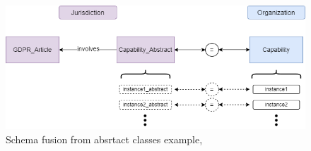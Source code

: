 \documentclass[
  a4paper,  %
  twoside,  %
  bibliography=totoc,
  headsepline,
  cleardoublepage=empty,
  parskip=half,
  draft=false
]{scrbook}
\begin{document}
    \begin{figure}
      \centering
      \includegraphics[width=\textwidth]{graphics/schema_concept_fusion.drawio.png}
      \caption{Schema fusion from absrtact classes example,}
      \label{fig:schema_fusion_same}
    \end{figure}
\end{document}
